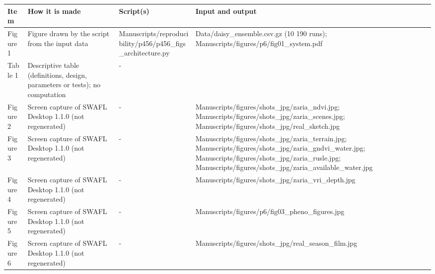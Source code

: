{\scriptsize\begin{longtable}{p{}p{}p{}p{}}\toprule\textbf{Item} & \textbf{How it is made} & \textbf{Script(s)} & \textbf{Input and output}\\\midrule\endhead
{}Figure 1 & Figure drawn by the script from the input data & Manuscripts/\allowbreak{}reproducibility/\allowbreak{}p456/\allowbreak{}p456\_\allowbreak{}figs\_\allowbreak{}architecture.py & Data/\allowbreak{}daisy\_\allowbreak{}ensemble.csv.gz (10 190 runs);  Manuscripts/\allowbreak{}figures/\allowbreak{}p6/\allowbreak{}fig01\_\allowbreak{}system.pdf\\
{}Table 1 & Descriptive table (definitions, design, parameters or tests); no computation & - & \\
{}Figure 2 & Screen capture of SWAFL Desktop 1.1.0 (not regenerated) & - & Manuscripts/\allowbreak{}figures/\allowbreak{}shots\_\allowbreak{}jpg/\allowbreak{}zaria\_\allowbreak{}ndvi.jpg;  Manuscripts/\allowbreak{}figures/\allowbreak{}shots\_\allowbreak{}jpg/\allowbreak{}zaria\_\allowbreak{}scenes.jpg;  Manuscripts/\allowbreak{}figures/\allowbreak{}shots\_\allowbreak{}jpg/\allowbreak{}real\_\allowbreak{}sketch.jpg\\
{}Figure 3 & Screen capture of SWAFL Desktop 1.1.0 (not regenerated) & - & Manuscripts/\allowbreak{}figures/\allowbreak{}shots\_\allowbreak{}jpg/\allowbreak{}zaria\_\allowbreak{}terrain.jpg;  Manuscripts/\allowbreak{}figures/\allowbreak{}shots\_\allowbreak{}jpg/\allowbreak{}zaria\_\allowbreak{}gndvi\_\allowbreak{}water.jpg;  Manuscripts/\allowbreak{}figures/\allowbreak{}shots\_\allowbreak{}jpg/\allowbreak{}zaria\_\allowbreak{}rusle.jpg;  Manuscripts/\allowbreak{}figures/\allowbreak{}shots\_\allowbreak{}jpg/\allowbreak{}zaria\_\allowbreak{}available\_\allowbreak{}water.jpg\\
{}Figure 4 & Screen capture of SWAFL Desktop 1.1.0 (not regenerated) & - & Manuscripts/\allowbreak{}figures/\allowbreak{}shots\_\allowbreak{}jpg/\allowbreak{}zaria\_\allowbreak{}vri\_\allowbreak{}depth.jpg\\
{}Figure 5 & Screen capture of SWAFL Desktop 1.1.0 (not regenerated) & - & Manuscripts/\allowbreak{}figures/\allowbreak{}p6/\allowbreak{}fig03\_\allowbreak{}pheno\_\allowbreak{}figures.jpg\\
{}Figure 6 & Screen capture of SWAFL Desktop 1.1.0 (not regenerated) & - & Manuscripts/\allowbreak{}figures/\allowbreak{}shots\_\allowbreak{}jpg/\allowbreak{}real\_\allowbreak{}season\_\allowbreak{}film.jpg\\

\end{longtable}}
